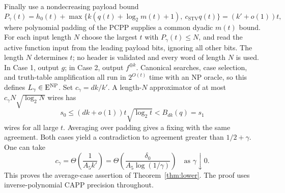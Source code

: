 Finally use a nondecreasing payload bound
\[
 P_\gamma(t)=h_0(t)+
 \max\{k(q(t)+\log_2m(t)+1),\ c_{\mathrm{STV}}q(t)\}
 =(k'+o(1))t,
\]
where polynomial padding of the PCPP supplies a common dyadic
$m(t)$ bound. For each input length $N$ choose the largest $t$ with
$P_\gamma(t)\le N$, and read the active function input from the leading payload bits, ignoring
all other bits. The length $N$ determines $t$; no header is validated and
every word of length $N$ is used. In Case 1, output $g$; in Case 2, output $f^{\oplus k}$. Canonical
searches, case selection, and truth-table amplification all run in
$2^{O(t)}$ time with an NP oracle, so this defines $L_\gamma\in\mathrm{E}^{\mathrm{NP}}$.
Set $c_\gamma=dk/k'$. A length-$N$ approximator of at most
$c_\gamma N\sqrt{\log_2N}$ wires has
\[
 s_0\le(dk+o(1))t\sqrt{\log_2t}<B_{dk}(q)=s_1
\]
wires for all large $t$. Averaging over padding gives a fixing with
the same agreement. Both cases yield a contradiction to agreement
greater than $1/2+\gamma$. One can take
\[
 c_\gamma=\Theta\!\left(\frac{1}{A_5k'}\right)
 =\Theta\!\left(\frac{\delta_0}{A_5\log(1/\gamma)}\right)
 \quad\text{as }\gamma\downarrow0.
\]
This proves the average-case assertion of
Theorem~\ref{thm:lower}. The proof uses inverse-polynomial CAPP
precision throughout.
